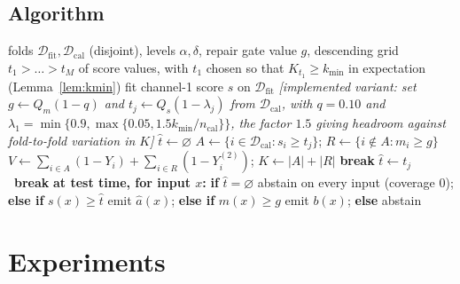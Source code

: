 \documentclass[review,number,doubleblind]{elsarticle}
\theoremstyle{plain}
\theoremstyle{definition}
\theoremstyle{remark}
\begin{document}
\subsection{Algorithm}

\begin{algorithm}[t]
\caption{CCRC (calibration and deployment). Thresholds are score \emph{values}, fixed before
calibration, which is what Theorem~\ref{thm:validity} covers; the bracketed lines are the
rank-indexed substitution our implementation makes (Remark~\ref{rem:rankvsvalue}).}
\label{alg:ccrc}
\begin{algorithmic}[1]
\Require folds $\mathcal{D}_{\mathrm{fit}},\mathcal{D}_{\mathrm{cal}}$ (disjoint), levels
$\alpha,\delta$, repair gate value $g$, descending grid $t_1>\dots>t_M$ of score values, with
$t_1$ chosen so that $K_{t_1}\ge k_{\min}$ in expectation (Lemma~\ref{lem:kmin})
\State fit channel-1 score $s$ on $\mathcal{D}_{\mathrm{fit}}$ 
\Statex \emph{[implemented variant: set $g\gets Q_m(1-q)$ and $t_j\gets Q_s(1-\lambda_j)$ from
$\mathcal{D}_{\mathrm{cal}}$, with $q=0.10$ and
$\lambda_1=\min\{0.9,\max\{0.05,1.5k_{\min}/n_{\mathrm{cal}}\}\}$, the factor $1.5$ giving
headroom against fold-to-fold variation in $K$]}
\State $\hat t\gets\varnothing$
  \State $A\gets\{i\in\mathcal{D}_{\mathrm{cal}}:s_i\ge t_j\}$;
         $R\gets\{i\notin A:m_i\ge g\}$
  \State $V\gets\sum_{i\in A}(1-Y_i)+\sum_{i\in R}(1-Y^{(2)}_i)$; $K\gets|A|+|R|$
   \textbf{break} 
   $\hat t\gets t_j$
  \Else\ \textbf{break} 
  \EndIf
\EndFor
\State \textbf{at test time, for input $x$:} \textbf{if} $\hat t=\varnothing$ abstain on
  every input (coverage $0$);
  \textbf{else if} $s(x)\ge\hat t$ emit $\hat a(x)$;
  \textbf{else if} $m(x)\ge g$ emit $b(x)$;
  \textbf{else} abstain
  \Statex {}
\end{algorithmic}
\end{algorithm}

\section{Experiments}
\label{sec:exp}
\end{document}
